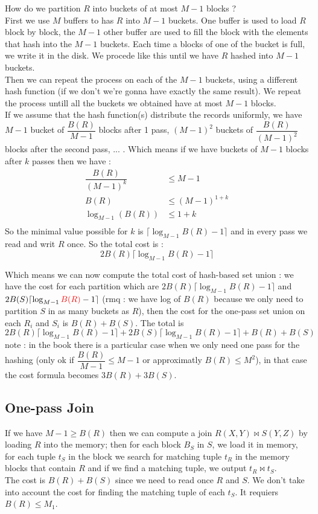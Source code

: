 \documentclass[12pt,a4paper]{article}
\begin{document}
How do we partition $R$ into buckets of at most $M-1$ blocks ?\\
First we use $M$ buffers to has $R$ into $M-1$ buckets. One buffer is used to load $R$ block by block, the $M-1$ other buffer are used to fill the block with the elements that hash into the $M-1$ buckets. Each time a blocks of one of the bucket is full, we write it in the disk. We procede like this until we have $R$ hashed into $M-1$ buckets.\\ 
Then we can repeat the process on each of the $M-1$ buckets, using a different hash function (if we don't we're gonna have exactly the same result). We repeat the process untill all the buckets we obtained have at most $M-1$ blocks.\\

If we assume that the hash function(s) distribute the records uniformly, we have $M-1$ bucket of $\dfrac{B(R)}{M-1}$ blocks after 1 pass, $(M-1)^2$ buckets of $\dfrac{B(R)}{(M-1)^2}$ blocks after the second pass, ... . Which means if we have buckets of $M-1$ blocks after $k$ passes then we have :
$$\begin{array}{rl}
\dfrac{B(R)}{(M-1)^k} & \leq M-1 \\
B(R) & \leq (M-1)^{1+k} \\
\log_{M-1} (B(R)) & \leq 1 + k \\
\end{array}$$
So the minimal value possible for $k$ is $\lceil \log_{M-1} B(R) - 1 \rceil$ and in every pass we read and writ $R$ once. So the total cost is :
$$2B(R) \lceil \log_{M-1} B(R) - 1 \rceil$$

Which means we can now compute the total cost of hash-based set union : we have the cost for each partition which are $2B(R) \lceil \log_{M-1} B(R) - 1 \rceil$ and $2B(S) \lceil \log_{M-1} \textcolor{red}{B(R)} - 1 \rceil$ (rmq : we have log of $B(R)$ because we only need to partition $S$ in as many buckets as $R$), then the cost for the one-pass set union on each $R_i$ and $S_i$ is $B(R) + B(S)$. The total is 
$$2B(R) \lceil \log_{M-1} B(R) - 1 \rceil + 2B(S) \lceil \log_{M-1} B(R) - 1 \rceil + B(R) + B(S)$$
note : in the book there is a particular case when we only need one pass for the hashing (only ok if $\dfrac{B(R)}{M-1} \leq M-1$ or approximatly $B(R) \leq M^2$), in that case the cost formula becomes $3B(R) + 3B(S)$.

\subsection{One-pass Join}
If we have $M-1 \geq B(R)$ then we can compute a join $R(X,Y) \Join S(Y,Z)$ by loading $R$ into the memory; then for each block $B_S$ in $S$, we load it in memory, for each tuple $t_S$ in the block we search for matching tuple $t_R$ in the memory blocks that contain $R$ and if we find a matching tuple, we output $t_R \Join t_S$.\\
The cost is $B(R) + B(S)$ since we need to read once $R$ and $S$. We don't take into account the cost for finding the matching tuple of each $t_S$.
It requiers $B(R) \leq M_1$.
\end{document}
